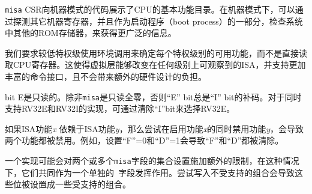 \iffalse
\begin{commentary}
The {\tt misa} CSR exposes a rudimentary catalog of CPU features
to machine-mode code.  More extensive information can be obtained in
machine mode by probing other machine registers, and examining other
ROM storage in the system as part of the boot process.

We require that lower privilege levels execute environment calls
instead of reading CPU registers to determine features available at
each privilege level. This enables virtualization layers to alter the
ISA observed at any level, and supports a much richer command
interface without burdening hardware designs.
\end{commentary}
\fi

{\tt misa} CSR向机器模式的代码展示了CPU的基本功能目录。在机器模式下，可以通过探测其它机器寄存器，并且作为启动程序（boot process）的一部分，检查系统中其他的ROM存储器，来获得更广泛的信息。

我们要求较低特权级使用环境调用来确定每个特权级别的可用功能，而不是直接读取CPU寄存器。这使得虚拟层能够改变在任何级别上可观察到的ISA，并支持更加丰富的命令接口，且不会带来额外的硬件设计的负担。

\iffalse
The ``E'' bit is read-only.  Unless {\tt misa} is all read-only zero, the ``E''
bit always reads as the complement of the ``I'' bit.  An implementation that
supports both RV32E and RV32I can select RV32E by clearing the ``I'' bit.
\fi

bit E是只读的。除非{\tt misa}是只读全零，否则``E'' bit总是``I'' bit的补码。对于同时支持RV32E和RV32I的实现，可通过清除“I”bit来选择RV32E。

\iffalse
If an ISA feature {\em x} depends on an ISA feature {\em y}, then attempting
to enable feature {\em x} but disable feature {\em y} results in both features
being disabled.  For example, setting ``F''=0 and ``D''=1 results in both
``F'' and ``D'' being cleared.
\fi
如果ISA功能{\em x} 依赖于ISA功能{\em y}，那么尝试在启用功能{\em x}的同时禁用功能{\em y}，会导致两个功能都被禁用。例如，设置``F''=0和``D''=1会导致``F''和``D''都被清除。

\iffalse
An implementation may impose additional constraints on the collective setting
of two or more {\tt misa} fields, in which case they function collectively as
a single \warl\ field.  An attempt to write an unsupported combination causes
those bits to be set to some supported combination.
\fi

一个实现可能会对两个或多个{\tt misa}字段的集合设置施加额外的限制，在这种情况下，它们共同作为一个单独的\warl\ 字段发挥作用。尝试写入不受支持的组合会导致这些位被设置成一些受支持的组合。

